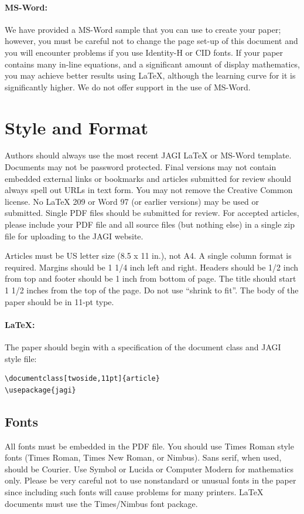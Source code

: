 \documentclass[twoside,11pt]{article}
\begin{document}
\paragraph{MS-Word:} We have provided a MS-Word sample that you can use to create your paper; however, you must be careful not to change the page set-up of this document and you will encounter problems if you use Identity-H or CID fonts. If your paper contains many in-line equations, and a significant amount of display mathematics, you may achieve better results using \LaTeX{}, although the learning curve for it is significantly higher. We do not offer support in the use of MS-Word.

\section{Style and Format}
Authors should always use the most recent JAGI \LaTeX{} or MS-Word template.  Documents may not be password protected.  Final versions may not contain embedded external links or bookmarks and articles submitted for review should always spell out URLs in text form.  You may not remove the Creative Common license.  No \LaTeX{} 209 or Word 97 (or earlier versions) may be used or submitted.  Single PDF files should be submitted for review.  For accepted articles, please include your PDF file and all source files (but nothing else) in a single zip file for uploading to the JAGI website.

Articles must be US letter size (8.5 x 11 in.), not A4.  A single column format is required.  Margins should be 1 1/4 inch left and right.  Headers should be 1/2 inch from top and footer should be 1 inch from bottom of page. The title should start 1 1/2 inches from the top of the page.  Do not use ``shrink to fit''. The body of the paper should be in 11-pt type.

\paragraph{\LaTeX{}:} The paper should begin with a specification of the document class and JAGI style file: 
\begin{verbatim}\documentclass[twoside,11pt]{article} 
\usepackage{jagi} 
\end{verbatim}

\subsection{Fonts}
All fonts must be embedded in the PDF file.  You should use Times Roman style fonts (Times Roman, Times New Roman, or Nimbus).  Sans serif, when used, should be Courier.  Use Symbol or Lucida or Computer Modern for mathematics only.  Please be very careful not to use nonstandard or unusual fonts in the paper since including such fonts will cause problems for many printers.  \LaTeX{} documents must use the Times/Nimbus font package.
\end{document}
